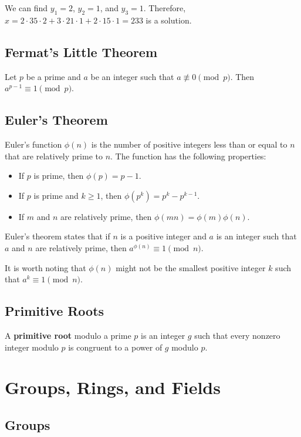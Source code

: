 \documentclass[a4paper,12pt]{article}
\begin{document}
We can find $y_1 = 2$, $y_2 = 1$, and $y_3 = 1$.
Therefore, $x = 2 \cdot 35 \cdot 2 + 3 \cdot 21 \cdot 1 + 2 \cdot 15 \cdot 1 = 233$ is a solution.

\subsection{Fermat's Little Theorem}

Let $p$ be a prime and $a$ be an integer such that $a \not\equiv 0 \pmod{p}$.
Then $a^{p-1} \equiv 1 \pmod{p}$.

\subsection{Euler's Theorem}

Euler's function $\phi(n)$ is the number of positive integers less than or equal to $n$ that are relatively prime to $n$.
The function has the following properties:
\begin{itemize}
	\item If $p$ is prime, then $\phi(p) = p-1$.
	\item If $p$ is prime and $k \geq 1$, then $\phi(p^k) = p^k - p^{k-1}$.
	\item If $m$ and $n$ are relatively prime, then $\phi(mn) = \phi(m) \phi(n)$.
\end{itemize}

Euler's theorem states that if $n$ is a positive integer and $a$ is an integer such that $a$ and $n$ are relatively prime, then $a^{\phi(n)} \equiv 1 \pmod{n}$.

It is worth noting that $\phi(n)$ might not be the smallest positive integer $k$ such that $a^k \equiv 1 \pmod{n}$.

\subsection{Primitive Roots}

A \textbf{primitive root} modulo a prime $p$ is an integer $g$ such that every nonzero integer modulo $p$ is congruent to a power of $g$ modulo $p$.

\section{Groups, Rings, and Fields}

\subsection{Groups}
\end{document}
